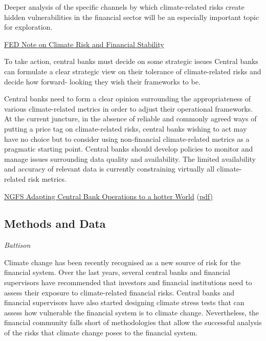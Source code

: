 \documentclass[
]{book}
\begin{document}
Deeper analysis of the specific channels by which climate-related risks create hidden vulnerabilities in the financial sector will be an especially important topic for exploration.

\href{https://www.federalreserve.gov/econres/notes/feds-notes/climate-change-and-financial-stability-20210319.htm}{FED Note on Climate Risk and Financial Stability}

To take action, central banks must decide
on some strategic issues
Central banks can formulate a clear strategic view on their
tolerance of climate-related risks and decide how forward-
looking they wish their frameworks to be.

Central banks need to form a clear opinion surrounding
the appropriateness of various climate-related metrics in
order to adjust their operational frameworks. At the current
juncture, in the absence of reliable and commonly agreed
ways of putting a price tag on climate-related risks, central
banks wishing to act may have no choice but to consider
using non-financial climate-related metrics as a pragmatic
starting point.
Central banks should develop policies to monitor and
manage issues surrounding data quality and availability.
The limited availability and accuracy of relevant data is
currently constraining virtually all climate-related risk
metrics.

\href{https://www.ngfs.net/en/adapting-central-bank-operations-hotter-world-reviewing-some-options}{NGFS Adapting Central Bank Operations to a hotter World}
\href{pdf/ngfs_2021_monetary_policy_operations.pdf}{(pdf)}

\hypertarget{methods-and-data}{%
\subsection{Methods and Data}\label{methods-and-data}}

\emph{Battison}

Climate change has been recently recognised as a new source of risk for the financial system. Over the last years, several central banks and financial supervisors have recommended that investors and financial institutions need to assess their exposure to climate-related financial risks. Central banks and financial supervisors have also started designing climate stress tests that can assess how vulnerable the financial system is to climate change.
Nevertheless, the financial community falls short of methodologies that allow the successful analysis of the risks that climate change poses to the financial system.
\end{document}
